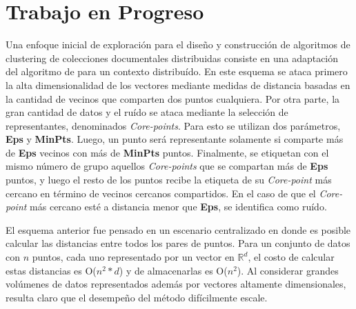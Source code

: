 \documentclass[10pt]{article}
\begin{document}
\section{Trabajo en Progreso}
Una enfoque inicial de exploración para el dise\~no y construcción de algoritmos de clustering de colecciones documentales distribuidas consiste en una adaptación del algoritmo de \cite{ESK03} para un contexto distribuído. En este esquema se ataca primero la alta dimensionalidad de los vectores mediante medidas de distancia basadas en la cantidad de vecinos que comparten dos puntos cualquiera. Por otra parte, la gran cantidad de datos y el ruído se ataca mediante la selección de representantes, denominados \textit{Core-points}. Para esto se utilizan dos parámetros, \textbf{Eps} y \textbf{MinPts}. Luego, un punto será representante solamente si comparte más de \textbf{Eps} vecinos con más de \textbf{MinPts} puntos. Finalmente, se etiquetan con el mismo número de grupo aquellos \textit{Core-points} que se compartan más de \textbf{Eps} puntos, y luego el resto de los puntos recibe la etiqueta de su \textit{Core-point} más cercano en término de vecinos cercanos compartidos. En el caso de que el \textit{Core-point} más cercano esté a distancia menor que \textbf{Eps}, se identifica como ruído.

El esquema anterior fue pensado en un escenario centralizado en donde es posible calcular las distancias entre todos los pares de puntos. Para un conjunto de datos con $n$ puntos, cada uno representado por un vector en $\mathbb{R}^d$, el costo de calcular estas distancias es O($n^2 * d$) y de almacenarlas es O($n^2$). Al considerar grandes volúmenes de datos representados además por vectores altamente dimensionales, resulta claro que el desempe\~no del método difícilmente escale.
\end{document}
